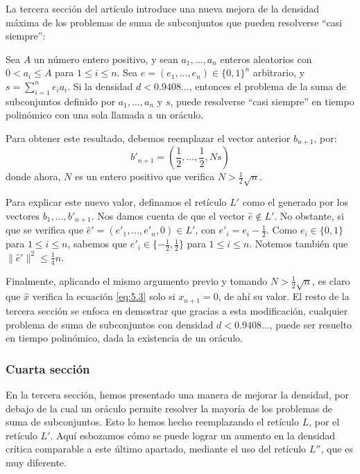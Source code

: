     La tercera sección del artículo introduce una nueva mejora de la densidad máxima de los problemas de suma de subconjuntos que pueden resolverse ``casi siempre'':
    
    \begin{teorema} \cite{artCoster}
        Sea $A$ un número entero positivo, y sean $a_{1}, ... , a_{n}$ enteros aleatorios con $0 < a_{i} \leq A$ para $1 \leq i \leq n$. Sea $e = (e_{1},..., e_{n}) \in \{0, 1\}^{n}$ arbitrario, y $s = \sum_{i=1}^{n} e_{i}a_{i}$. Si la densidad $d < 0.9408...$, entonces el problema de la suma de subconjuntos definido por $a_{1}, ... , a_{n}$ y $s$, puede resolverse ``casi siempre'' en tiempo polinómico con una sola llamada a un oráculo.
    \end{teorema}

    Para obtener este resultado, debemos reemplazar el vector anterior $b_{n+1}$, por:
    \begin{equation}
        b'_{n+1} = (\frac{1}{2}, ..., \frac{1}{2}, Ns)
    \end{equation}
    donde ahora, $N$ es un entero positivo que verifica $N > \frac{1}{2}\sqrt{n}$. 

    Para explicar este nuevo valor, definamos el retículo $L'$ como el generado por los vectores $b_{1}, ... , b'_{n+1}$. Nos damos cuenta de que el vector $\hat{e} \notin L'$. No obstante, si que se verifica que $\hat{e}' = (e'_{1}, ... , e'_{n}, 0) \in L'$, con $e'_{i} = e_{i} - \frac{1}{2}$. Como $e_{i} \in \{0, 1\}$ para $1 \leq i \leq n$, sabemos que $e'_{i} \in \{-\frac{1}{2}, \frac{1}{2}\}$ para $1 \leq i \leq n$. Notemos también que $\| \hat{e}' \|^{2} \leq \frac{1}{4}n$. 
    
    Finalmente, aplicando el mismo argumento previo y tomando $N > \frac{1}{2} \sqrt{n}$, es claro que $\hat{x}$ verifica la ecuación \eqref{eq:5.3} solo si $x_{n+1} = 0$, de ahí su valor. El resto de la tercera sección se enfoca en demostrar que gracias a esta modificación, cualquier problema de suma de subconjuntos con densidad $d < 0.9408...$, puede ser resuelto en tiempo polinómico, dada la existencia de un oráculo.

    \subsubsection{Cuarta sección}
    
    En la tercera sección, hemos presentado una manera de mejorar la densidad, por debajo de la cual un oráculo permite resolver la mayoría de los problemas de suma de subconjuntos. Esto lo hemos hecho reemplazando el retículo $L$, por el retículo $L'$. Aquí esbozamos cómo se puede lograr un aumento en la densidad crítica comparable a este último apartado, mediante el uso del retículo $L''$, que es muy diferente. 
    
